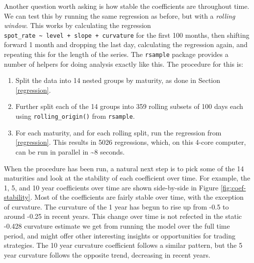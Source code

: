 \documentclass[openany]{book}
\providecommand{\tightlist}{%
  \setlength{\itemsep}{0pt}\setlength{\parskip}{0pt}}
\theoremstyle{definition}
\theoremstyle{definition}
\theoremstyle{definition}
\theoremstyle{remark}
\begin{document}
Another question worth asking is how stable the coefficients are
throughout time. We can test this by running the same regression as
before, but with a \emph{rolling window}. This works by calculating the
regression
\texttt{spot\_rate\ \textasciitilde{}\ level\ +\ slope\ +\ curvature}
for the first 100 months, then shifting forward 1 month and dropping the
last day, calculating the regression again, and repeating this for the
length of the series. The \texttt{rsample} package provides a number of
helpers for doing analysis exactly like this. The procedure for this is:

\begin{enumerate}
\def\labelenumi{\arabic{enumi})}
\tightlist
\item
  Split the data into 14 nested groups by maturity, as done in Section
  \ref{regression}.
\item
  Further split each of the 14 groups into 359 rolling subsets of 100
  days each using \texttt{rolling\_origin()} from \texttt{rsample}.
\item
  For each maturity, and for each rolling split, run the regression from
  \ref{regression}. This results in 5026 regressions, which, on this
  4-core computer, can be run in parallel in \textasciitilde{}8 seconds.
\end{enumerate}

\small

\normalsize

\small

\normalsize

\small

\normalsize

When the procedure has been run, a natural next step is to pick some of
the 14 maturities and look at the stability of each coefficient over
time. For example, the 1, 5, and 10 year coefficients over time are
shown side-by-side in Figure \ref{fig:coef-stability}. Most of the
coefficients are fairly stable over time, with the exception of
curvature. The curvature of the 1 year has begun to rise up from -0.5 to
around -0.25 in recent years. This change over time is not refected in
the static -0.428 curvature estimate we get from running the model over
the full time period, and might offer other interesting insights or
opportunities for trading strategies. The 10 year curvature coefficient
follows a similar pattern, but the 5 year curvature follows the opposite
trend, decreasing in recent years.

\small

\normalsize
\end{document}
